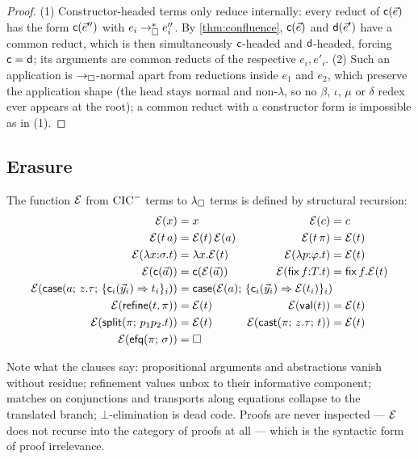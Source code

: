 \begin{proof}
(1) Constructor-headed terms only reduce internally: every reduct of
$\mathsf{c}(\vec{e})$ has the form $\mathsf{c}(\vec{e}'')$ with $e_i \rightarrow_{\square}^{*}
e''_i$.  By \cref{thm:confluence}, $\mathsf{c}(\vec{e})$ and
$\mathsf{d}(\vec{e}')$ have a common reduct, which is then simultaneously
$\mathsf{c}$-headed and $\mathsf{d}$-headed, forcing $\mathsf{c} = \mathsf{d}$;
its arguments are common reducts of the respective $e_i, e'_i$.
(2) Such an application is $\rightarrow_{\square}$-normal apart from reductions inside
$e_1$ and $e_2$, which preserve the application shape (the head stays
normal and non-$\lambda$, so no $\beta$, $\iota$, $\mu$ or $\delta$ redex
ever appears at the root); a common reduct with a constructor form is
impossible as in (1).
\end{proof}

\subsection{Erasure}

\begin{definition}[Erasure]
\label{def:erasure}
The function $\mathcal{E}$ from $\mathrm{CIC}^{-}$ terms to $\lambda_{\square}$ terms is defined by
structural recursion:
\begin{align*}
  \erase{x} &= x
  & \erase{c} &= c
  \\
  \erase{t\,a} &= \erase{t}\,\erase{a}
  & \erase{t\,\pi} &= \erase{t}
  \\
  \erase{\lambda x{:}\sigma.t} &= \lambda x.\erase{t}
  & \erase{\lambda p{:}\varphi.t} &= \erase{t}
  \\
  \erase{\wcns{c}(\tup{a})} &= \wcns{c}(\erase{\tup{a}})
  & \erase{\tfix\,f{:}T.t} &= \mathsf{fix}\,f.\erase{t}
  \\
  \erase{\tcase{a}{z.\tau}{\{\wcns{c}_i(\tup{y}_i) \Rightarrow t_i\}_i}}
    &\mathrlap{{}= \mathsf{case}(\erase{a};\,
       \{\wcns{c}_i(\tup{y}_i) \Rightarrow \erase{t_i}\}_i)}
  \\
  \erase{\trefine{t}{\pi}} &= \erase{t}
  & \erase{\tval{t}} &= \erase{t}
  \\
  \erase{\tsplit{\pi}{p_1 p_2.t}} &= \erase{t}
  & \erase{\tcast{\pi}{z.\tau}{t}} &= \erase{t}
  \\
  \erase{\texfalso{\pi}{\sigma}} &= \bx
\end{align*}
\end{definition}

Note what the clauses say: propositional arguments and abstractions vanish
without residue; refinement values unbox to their informative component;
matches on conjunctions and transports along equations collapse to the
translated branch; $\bot$-elimination is dead code.  Proofs are never
inspected --- $\mathcal{E}$ does not recurse into the category of proofs at
all --- which is the syntactic form of proof irrelevance.

